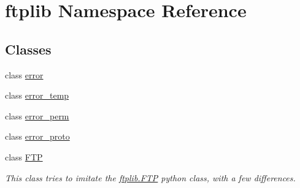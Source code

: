 \hypertarget{namespaceftplib}{
\section{ftplib Namespace Reference}
\label{namespaceftplib}
}
\subsection*{Classes}
\begin{CompactItemize}
\item 
class \hyperlink{classftplib_1_1error}{error}
\item 
class \hyperlink{classftplib_1_1error__temp}{error\_\-temp}
\item 
class \hyperlink{classftplib_1_1error__perm}{error\_\-perm}
\item 
class \hyperlink{classftplib_1_1error__proto}{error\_\-proto}
\item 
class \hyperlink{classftplib_1_1FTP}{FTP}
\begin{CompactList}\small\item\em This class tries to imitate the \hyperlink{classftplib_1_1FTP}{ftplib.FTP} python class, with a few differences. \item\end{CompactList}\end{CompactItemize}
